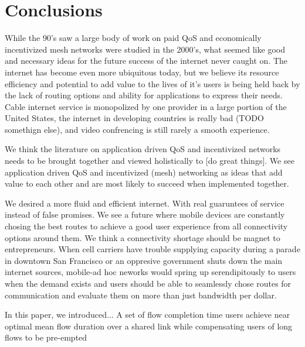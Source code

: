 \section{Conclusions}
While the 90's saw a large body of work on paid QoS and economically incentivized mesh networks were studied in the 2000's, what seemed like good and necessary ideas for the future success of the internet never caught on.
The internet has become even more ubiquitous today, but we believe its resource efficiency and potential to add value to the lives of it's users is being held back by the lack of routing options and ability for applications to express their needs.
Cable internet service is monopolized by one provider in a large portion of the United States, the internet in developing countries is really bad (TODO somethign else), and video confrencing is still rarely a smooth experience.

We think the literature on application driven QoS and incentivized networks needs to be brought together and viewed holistically to [do great things]. We see application driven QoS and incentivized (mesh) networking as ideas that add value to each other and are most likely to succeed when implemented together.

We desired a more fluid and efficient internet. With real guaruntees of service instead of false promises. We see a future where mobile devices are constantly chosing the best routes to achieve a good user experience from all connectivity options around them.
We think a connectivity shortage should be magnet to entrepreneurs. When cell carriers have trouble supplying capacity during a parade in downtown San Francisco or an oppresive government shuts down the main internet sources, mobile-ad hoc neworks would spring up serendipitously to users when the demand exists and users should be able to seamlessly chose routes for communication and evaluate them on more than just bandwidth per dollar.

In this paper, we introduced...
A set of flow completion time users achieve near optimal mean flow duration over a shared link while compensating users of long flows to be pre-empted




\label{sec:conc}
